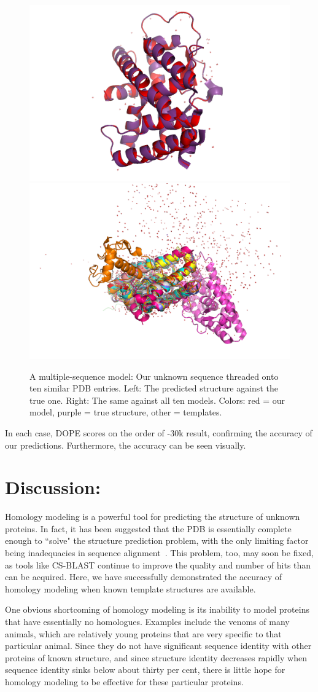 \documentclass[]{report}   %
\begin{document}
\begin{figure}[h!]
 \begin{center}
  \includegraphics[width=0.45\linewidth]{10_templates_truth.png}
  \includegraphics[width=0.45\linewidth]{10_templates.png}
  \caption{A multiple-sequence model: Our unknown sequence threaded onto ten similar PDB entries. Left: The predicted structure against the true one. Right: The same against all ten models. Colors: red = our model, purple = true structure, other = templates.}
  \label{fig:tt_10}
 \end{center}
\end{figure}

In each case, DOPE scores on the order of -30k result, confirming the accuracy of our predictions. Furthermore, the accuracy can be seen visually.

\section*{Discussion:}   

Homology modeling is a powerful tool for predicting the structure of unknown proteins. In fact, it has been suggested that the PDB is essentially complete enough to ``solve" the structure prediction problem, with the only limiting factor being inadequacies in sequence alignment~\cite{zhang2005protein}. This problem, too, may soon be fixed, as tools like CS-BLAST continue to improve the quality and number of hits than can be acquired. Here, we have successfully demonstrated the accuracy of homology modeling when known template structures are available.

One obvious shortcoming of homology modeling is its inability to model proteins that have essentially no homologues. Examples include the venoms of many animals, which are relatively young proteins that are very specific to that particular animal. Since they do not have significant sequence identity with other proteins of known structure, and since structure identity decreases rapidly when sequence identity sinks below about thirty per cent, there is little hope for homology modeling to be effective for these particular proteins.
\end{document}
